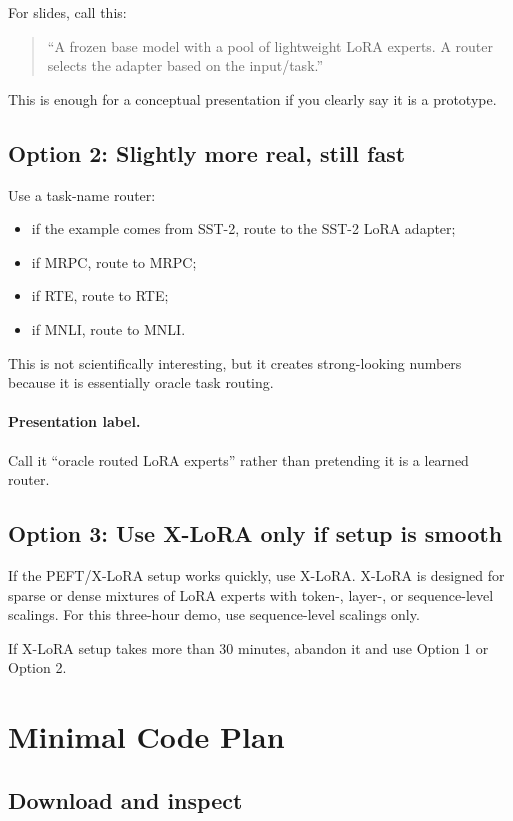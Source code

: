 \documentclass[11pt]{article}
\begin{document}
For slides, call this:
\begin{quote}
``A frozen base model with a pool of lightweight LoRA experts. A router selects the adapter based on the input/task.''
\end{quote}

This is enough for a conceptual presentation if you clearly say it is a prototype.

\subsection{Option 2: Slightly more real, still fast}

Use a task-name router:
\begin{itemize}
    \item if the example comes from SST-2, route to the SST-2 LoRA adapter;
    \item if MRPC, route to MRPC;
    \item if RTE, route to RTE;
    \item if MNLI, route to MNLI.
\end{itemize}

This is not scientifically interesting, but it creates strong-looking numbers because it is essentially oracle task routing.

\paragraph{Presentation label.}
Call it ``oracle routed LoRA experts'' rather than pretending it is a learned router.

\subsection{Option 3: Use X-LoRA only if setup is smooth}

If the PEFT/X-LoRA setup works quickly, use X-LoRA. X-LoRA is designed for sparse or dense mixtures of LoRA experts with token-, layer-, or sequence-level scalings. For this three-hour demo, use sequence-level scalings only.

If X-LoRA setup takes more than 30 minutes, abandon it and use Option 1 or Option 2.

\section{Minimal Code Plan}

\subsection{Download and inspect}
\end{document}
